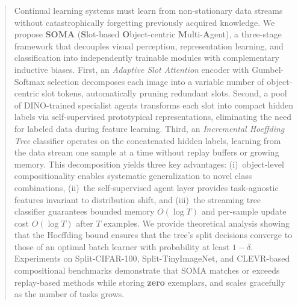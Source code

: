 \documentclass{article}
\begin{document}

\printAffiliationsAndNotice{}

\begin{abstract}
Continual learning systems must learn from non-stationary data streams without catastrophically forgetting previously acquired knowledge.
We propose \textbf{SOMA} (\textbf{S}lot-based \textbf{O}bject-centric \textbf{M}ulti-\textbf{A}gent), a three-stage framework that decouples visual perception, representation learning, and classification into independently trainable modules with complementary inductive biases.
First, an \textit{Adaptive Slot Attention} encoder with Gumbel-Softmax selection decomposes each image into a variable number of object-centric slot tokens, automatically pruning redundant slots.
Second, a pool of DINO-trained specialist agents transforms each slot into compact hidden labels via self-supervised prototypical representations, eliminating the need for labeled data during feature learning.
Third, an \textit{Incremental Hoeffding Tree} classifier operates on the concatenated hidden labels, learning from the data stream one sample at a time without replay buffers or growing memory.
This decomposition yields three key advantages:
(i)~object-level compositionality enables systematic generalization to novel class combinations,
(ii)~the self-supervised agent layer provides task-agnostic features invariant to distribution shift, and
(iii)~the streaming tree classifier guarantees bounded memory \(O(\log T)\) and per-sample update cost \(O(\log T)\) after \(T\) examples.
We provide theoretical analysis showing that the Hoeffding bound ensures that the tree's split decisions converge to those of an optimal batch learner with probability at least \(1-\delta\).
Experiments on Split-CIFAR-100, Split-TinyImageNet, and CLEVR-based compositional benchmarks demonstrate that SOMA matches or exceeds replay-based methods while storing \textbf{zero} exemplars, and scales gracefully as the number of tasks grows.
\end{abstract}
\end{document}

